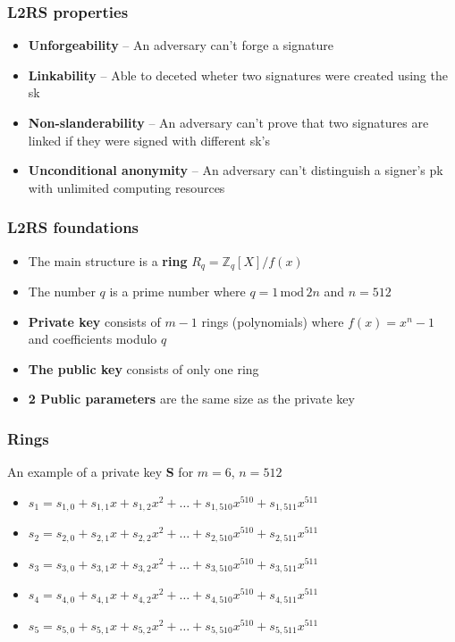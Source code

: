 \documentclass[%
  14pt,       				%
	c,                  %
	aspectratio=1610,   %
	unicode,						%
]{beamer}				    	%
\begin{document}
\begin{frame}
  \frametitle{L2RS properties}
  \large{
    \begin{itemize}
      \item \textbf{Unforgeability} -- An adversary can't forge a signature
      \item \textbf{Linkability} -- Able to deceted wheter two signatures were created using the sk
      \item \textbf{Non-slanderability} -- An adversary can't prove that two signatures are linked if they were signed with different sk's
      \item \textbf{Unconditional anonymity} -- An adversary can't distinguish a signer's pk with unlimited computing resources
    \end{itemize}
  }
\end{frame}


\begin{frame}
  \frametitle{L2RS foundations}
  \large{
    \begin{itemize}
      \item The main structure is a \textbf{ring} $R_q = \mathbb{Z}_q[X]/f(x)$
      \item The number $q$ is a prime number where $q=1\,\mathrm{mod}\,2n$ and $n=512$
      \item \textbf{Private key} consists of $m-1$ rings (polynomials) where $f(x) = x^n - 1$ and coefficients modulo $q$ 
      \item \textbf{The public key} consists of only one ring
      \item \textbf{2 Public parameters} are the same size as the private key
    \end{itemize}
  }
\end{frame}

\begin{frame}
  \frametitle{Rings}
  \large{
    An example of a private key \textbf{S} for $m=6$, $n=512$
    \begin{itemize}
      \item $s_1 = s_{1,0} + s_{1,1}x + s_{1,2}x^2 + \dots + s_{1,510}x^{510} + s_{1,511}x^{511}$
      \item $s_2 = s_{2,0} + s_{2,1}x + s_{2,2}x^2 + \dots + s_{2,510}x^{510} + s_{2,511}x^{511}$
      \item $s_3 = s_{3,0} + s_{3,1}x + s_{3,2}x^2 + \dots + s_{3,510}x^{510} + s_{3,511}x^{511}$
      \item $s_4 = s_{4,0} + s_{4,1}x + s_{4,2}x^2 + \dots + s_{4,510}x^{510} + s_{4,511}x^{511}$
      \item $s_5 = s_{5,0} + s_{5,1}x + s_{5,2}x^2 + \dots + s_{5,510}x^{510} + s_{5,511}x^{511}$
    \end{itemize}
  }
\end{frame}
\end{document}

